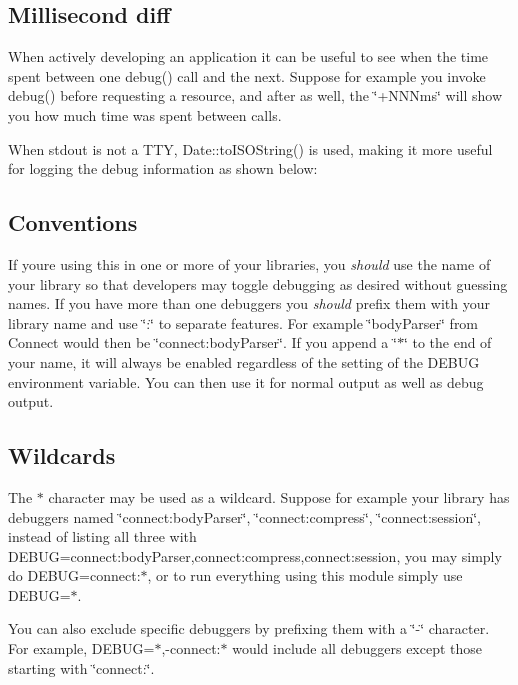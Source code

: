 \subsection*{Millisecond diff}

When actively developing an application it can be useful to see when the time spent between one {\ttfamily debug()} call and the next. Suppose for example you invoke {\ttfamily debug()} before requesting a resource, and after as well, the \char`\"{}+\+N\+N\+Nms\char`\"{} will show you how much time was spent between calls.



When stdout is not a T\+TY, {\ttfamily Date\+::to\+I\+S\+O\+String()} is used, making it more useful for logging the debug information as shown below\+:



\subsection*{Conventions}

If you\textquotesingle{}re using this in one or more of your libraries, you {\itshape should} use the name of your library so that developers may toggle debugging as desired without guessing names. If you have more than one debuggers you {\itshape should} prefix them with your library name and use \char`\"{}\+:\char`\"{} to separate features. For example \char`\"{}body\+Parser\char`\"{} from Connect would then be \char`\"{}connect\+:body\+Parser\char`\"{}. If you append a \char`\"{}$\ast$\char`\"{} to the end of your name, it will always be enabled regardless of the setting of the D\+E\+B\+UG environment variable. You can then use it for normal output as well as debug output.

\subsection*{Wildcards}

The {\ttfamily $\ast$} character may be used as a wildcard. Suppose for example your library has debuggers named \char`\"{}connect\+:body\+Parser\char`\"{}, \char`\"{}connect\+:compress\char`\"{}, \char`\"{}connect\+:session\char`\"{}, instead of listing all three with {\ttfamily D\+E\+B\+UG=connect\+:body\+Parser,connect\+:compress,connect\+:session}, you may simply do {\ttfamily D\+E\+B\+UG=connect\+:$\ast$}, or to run everything using this module simply use {\ttfamily D\+E\+B\+UG=$\ast$}.

You can also exclude specific debuggers by prefixing them with a \char`\"{}-\/\char`\"{} character. For example, {\ttfamily D\+E\+B\+UG=$\ast$,-\/connect\+:$\ast$} would include all debuggers except those starting with \char`\"{}connect\+:\char`\"{}.


